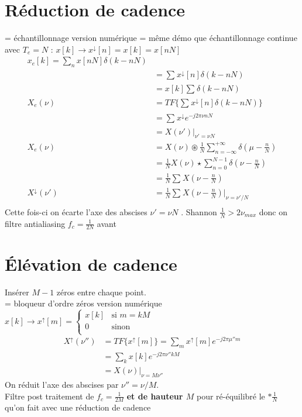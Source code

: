\documentclass{article}
\begin{document}
\begin{multicols}{2}
    \section{Réduction de cadence}
    = échantillonnage version numérique = même démo que échantillonnage continue avec $ T_e = N $  : $ x[k] \to x^\downarrow [n] = x[k] = x[nN] $
    \begin{align*}
        x_e[k] = \sum_{n}^{}x[nN] \delta (k-nN) \\
                &= \sum_{}^{}x^\downarrow [n] \delta (k - nN) \\
                &= x[k] \sum_{}^{}\delta (k - nN) \\
        X_e(\nu ) &= TF\{\sum_{}^{}x^\downarrow [n] \delta (k - nN)\} \\
                &= \sum_{}^{}x^\downarrow e^{- j 2 \pi \nu nN} \\
                &= X(\nu ') \vert_{\nu ' = \nu N} \\
        X_e(\nu ) &= X(\nu ) \circledast \frac{1}{N}\sum_{n= -\infty }^{+\infty }\delta (\mu - \frac{n}{N}) \\
                &= \frac{1}{N} X( \nu ) \star \sum_{n=0}^{N-1}\delta (\nu - \frac{n}{N}) \\
                &= \frac{1}{N} \sum_{}^{}X(\nu - \frac{n}{N}) \\
        X^\downarrow (\nu ') &= \frac{1}{N} \sum_{}^{}X(\nu - \frac{n}{N}) \vert _{\nu = \nu ' / N}\\
    \end{align*}
    Cette fois-ci on écarte l'axe des abscises $ \nu ' = \nu N $ . Shannon $ \frac{1}{N} > 2 \nu _{max} $  donc on filtre antialiasing $ f_c = \frac{1}{2N} $  avant 
    
    \section{Élévation de cadence}
    Insérer $ M - 1 $ zéros entre chaque point. \\
    = bloqueur d'ordre zéros version numérique \\
    $ x[k] \to x^\uparrow [m] = \begin{cases}
    x[k] &\text{si } m=kM\\
    0 &\text{sinon}\\
    \end{cases}  $ \begin{align*}
        X^\uparrow (\nu '') &= TF \{x^\uparrow [m]\} = \sum_{m}^{}x^\uparrow [m] e^{-j 2 \pi \mu '' m} \\
        &= \sum_{k}^{}x[k] e^{-j 2 \pi \nu '' kM} \\
        &= X(\nu ) \vert _{\nu  = M \nu ''}
    \end{align*}
    On réduit l'axe des abscises par $ \nu '' = \nu / M $. \\
    Filtre post traitement de $ f_c = \frac{1}{2M} $ \textbf{et de hauteur $ M $ } pour ré-équilibré le $ * \frac{1}{N} $ qu'on fait avec une réduction de cadence
    
    
\end{multicols}
\end{document}

